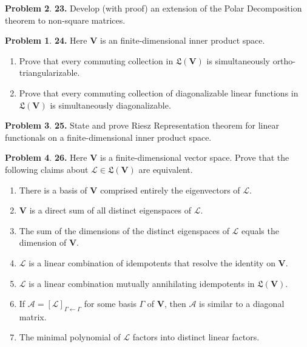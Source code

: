 \documentclass{article}
\theoremstyle{definition}
\newtheorem*{prob*}{Problem}
\newcommand{\V}{\mathbf{V}}
\newcommand{\A}{\mathcal{A}}
\newcommand{\lag}{\mathcal{L}}
\newcommand{\LL}{\mathfrak{L}}
\begin{document}
\begin{prob*}\textbf{23.} Develop (with proof) an extension of the Polar Decomposition theorem to non-square matrices.
	
	
	
	
\newpage





\begin{prob*}\textbf{24.} Here $\V$ is an finite-dimensional inner product space. 
	\begin{enumerate}
		\item Prove that every commuting collection in $\LL(\V)$ is simultaneously ortho-triangularizable.
		
		\item Prove that every commuting collection of diagonalizable linear functions in $\LL(\V)$ is simultaneously diagonalizable.
	\end{enumerate}
	
\end{prob*}
	
\end{prob*}




\newpage



\begin{prob*}\textbf{25.} State and prove Riesz Representation theorem for linear functionals on a finite-dimensional inner product space. 
	
\end{prob*}



\newpage




\begin{prob*}\textbf{26.} Here $\V$ is a finite-dimensional vector space. Prove that the following claims about $\lag \in \LL(\V)$ are equivalent.
	\begin{enumerate}
		\item There is a basis of $\V$ comprised entirely the eigenvectors of $\lag$.
		\item $\V$ is a direct sum of all distinct eigenspaces of $\lag$.
		\item The sum of the dimensions of the distinct eigenspaces of $\lag$ equals the dimension of $\V$.
		\item $\lag$ is a linear combination of idempotents that resolve the identity on $\V$.
		\item $\lag$ is a linear combination mutually annihilating idempotents in $\LL(\V)$.
		\item If $\A = [\lag]_{\Gamma\leftarrow\Gamma}$ for some basis $\Gamma$ of $\V$, then $\A$ is similar to a diagonal matrix.
		\item The minimal polynomial of $\lag$ factors into distinct linear factors. 
	\end{enumerate}
	
\end{prob*}
\end{document}
